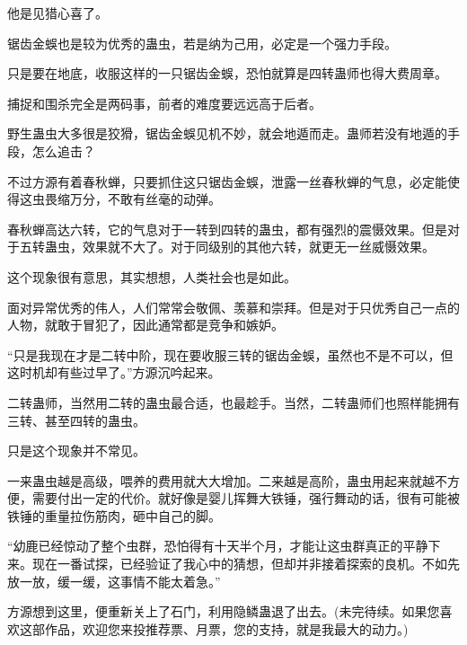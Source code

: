 \begin{this_body}
他是见猎心喜了。

锯齿金蜈也是较为优秀的蛊虫，若是纳为己用，必定是一个强力手段。

只是要在地底，收服这样的一只锯齿金蜈，恐怕就算是四转蛊师也得大费周章。

捕捉和围杀完全是两码事，前者的难度要远远高于后者。

野生蛊虫大多很是狡猾，锯齿金蜈见机不妙，就会地遁而走。蛊师若没有地遁的手段，怎么追击？

不过方源有着春秋蝉，只要抓住这只锯齿金蜈，泄露一丝春秋蝉的气息，必定能使得这虫畏缩万分，不敢有丝毫的动弹。

春秋蝉高达六转，它的气息对于一转到四转的蛊虫，都有强烈的震慑效果。但是对于五转蛊虫，效果就不大了。对于同级别的其他六转，就更无一丝威慑效果。

这个现象很有意思，其实想想，人类社会也是如此。

面对异常优秀的伟人，人们常常会敬佩、羡慕和崇拜。但是对于只优秀自己一点的人物，就敢于冒犯了，因此通常都是竞争和嫉妒。

“只是我现在才是二转中阶，现在要收服三转的锯齿金蜈，虽然也不是不可以，但这时机却有些过早了。”方源沉吟起来。

二转蛊师，当然用二转的蛊虫最合适，也最趁手。当然，二转蛊师们也照样能拥有三转、甚至四转的蛊虫。

只是这个现象并不常见。

一来蛊虫越是高级，喂养的费用就大大增加。二来越是高阶，蛊虫用起来就越不方便，需要付出一定的代价。就好像是婴儿挥舞大铁锤，强行舞动的话，很有可能被铁锤的重量拉伤筋肉，砸中自己的脚。

“幼鹿已经惊动了整个虫群，恐怕得有十天半个月，才能让这虫群真正的平静下来。现在一番试探，已经验证了我心中的猜想，但却并非接着探索的良机。不如先放一放，缓一缓，这事情不能太着急。”

方源想到这里，便重新关上了石门，利用隐鳞蛊退了出去。(未完待续。如果您喜欢这部作品，欢迎您来投推荐票、月票，您的支持，就是我最大的动力。)

\end{this_body}


